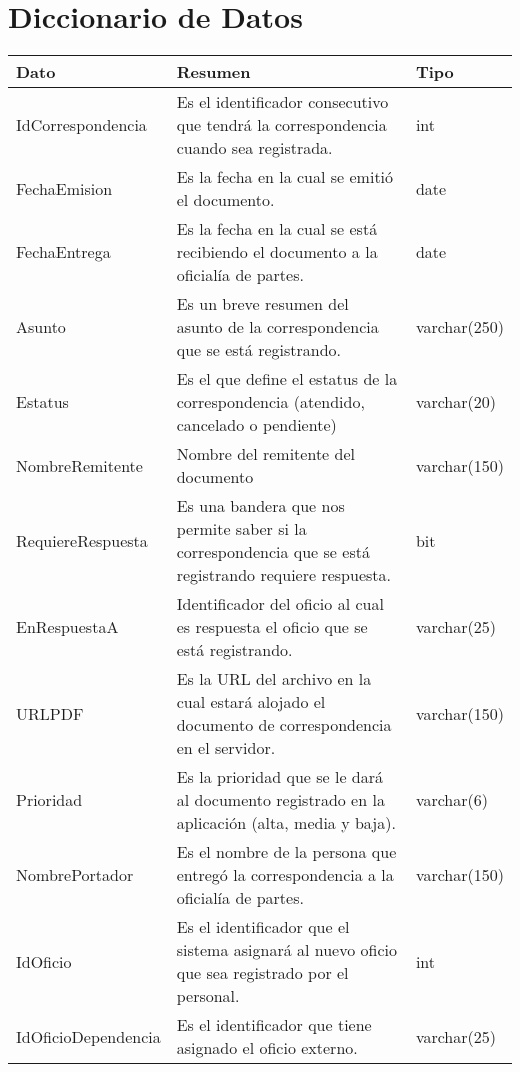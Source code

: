 \section{Diccionario de Datos}

\begin{table}[htbp!]
	\begin{center}
		\begin{tabular}{| l | l | l |}\hline 
			\textbf{Dato} & \textbf{Resumen} & \textbf{Tipo} \\\hline
			IdCorrespondencia & Es el identificador consecutivo que tendrá la correspondencia cuando sea registrada. & int \\ \hline
			FechaEmision & Es la fecha en la cual se emitió el documento. & date \\\hline
			FechaEntrega & Es la fecha en la cual se está recibiendo el documento a la oficialía de partes. & date \\\hline
			Asunto & Es un breve resumen del asunto de la correspondencia que se está registrando. & varchar(250) \\\hline
			Estatus & Es el que define el estatus de la correspondencia (atendido, cancelado o pendiente) & varchar(20) \\\hline
			NombreRemitente & Nombre del remitente del documento & varchar(150) \\\hline
			RequiereRespuesta & Es una bandera que nos permite saber si la correspondencia que se está registrando requiere respuesta. & bit \\\hline
			EnRespuestaA & Identificador del oficio al cual es respuesta el oficio que se está registrando. & varchar(25) \\\hline
			URLPDF & Es la URL del archivo en la cual estará alojado el documento de correspondencia en el servidor.& varchar(150)\\\hline
			Prioridad & Es la prioridad que se le dará al documento registrado en la aplicación (alta, media y baja).&
varchar(6)\\\hline
			NombrePortador & Es el nombre de la persona que entregó la correspondencia a la oficialía de partes. &  varchar(150)\\\hline
			IdOficio & Es el identificador que el sistema asignará al nuevo oficio que sea registrado por el personal.
 & int \\\hline
 			IdOficioDependencia & Es el identificador que tiene asignado el oficio externo. & varchar(25)\\\hline

\end{tabular}
\end{center}
\end{table}

